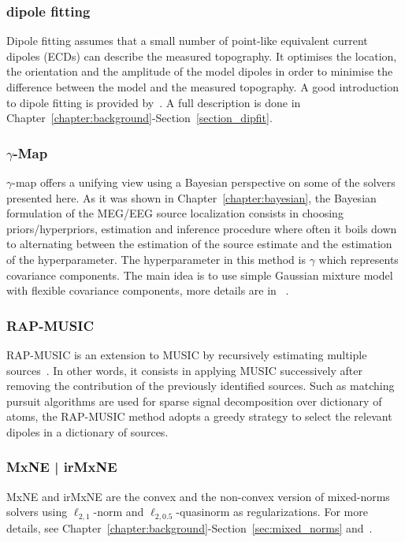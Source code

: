 \subsubsection{dipole fitting}
Dipole fitting assumes that a small number of point-like equivalent current dipoles (ECDs) can describe the measured topography. It optimises the location, the orientation and the amplitude of the model dipoles in order to minimise the difference between the model and the measured topography. A good introduction to dipole fitting is provided by~\cite{scherg1990fundamentals}. A full description is done in Chapter~\ref{chapter:background}-Section~\ref{section_dipfit}.

\subsubsection{$\gamma$-Map}
$\gamma$-map offers a unifying view using a Bayesian perspective on some of the solvers presented here. As it was shown in Chapter~\ref{chapter:bayesian}, the Bayesian formulation of the MEG/EEG source localization consists in choosing priors/hyperpriors, estimation and inference procedure where often it boils down to alternating between the estimation of the source estimate and the estimation of the hyperparameter. The hyperparameter in this method is $\gamma$ which represents covariance components. The main idea is to use simple Gaussian mixture model with flexible covariance components, more details are in ~\cite{Wipf-Nagarajan:2009}.

\subsubsection{RAP-MUSIC}
\Ac{RAP-MUSIC} is an extension to \ac{MUSIC} by recursively estimating multiple sources~\cite{mosher1997source,mosher1999source}. In other words, it consists in applying MUSIC successively after removing the contribution of the previously identified sources. Such as matching pursuit algorithms are used for sparse signal decomposition over dictionary of atoms, the RAP-MUSIC method adopts a greedy strategy to select the relevant dipoles in a dictionary of sources.

\subsubsection{MxNE | irMxNE}
\Ac{MxNE} and \ac{irMxNE} are the convex and the non-convex version of mixed-norms solvers using $\ell_{2,1}$-norm and $\ell_{2,0.5}$-quasinorm as regularizations. For more details, see Chapter~\ref{chapter:background}-Section~\ref{sec:mixed_norms} and~\cite{gramfort2012mixed,strohmeier-etal:16}.

